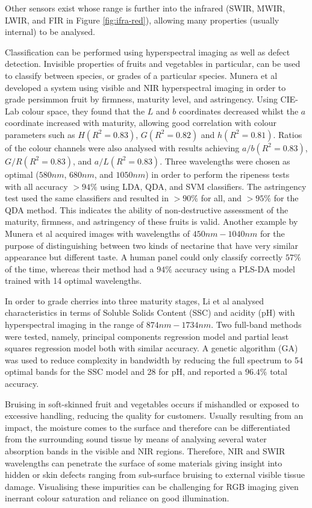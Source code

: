 \documentclass[fleqn,twoside,12pt]{report}
\begin{document}
Other sensors exist whose range is further into the infrared (SWIR, MWIR, LWIR, and FIR in Figure \ref{fig:ifra-red}), allowing many properties (usually internal) to be analysed.

Classification can be performed using hyperspectral imaging as well as defect detection. Invisible properties of fruits and vegetables in particular, can be used to classify between species, or grades of a particular species. Munera et al \cite{munera} developed a system using visible and NIR hyperspectral imaging in order to grade persimmon fruit by firmness, maturity level, and astringency. Using CIE-Lab colour space, they found that the $L$ and $b$ coordinates decreased whilst the $a$ coordinate increased with maturity, allowing good correlation with colour parameters such as $H(R^2 = 0.83)$, $G(R^2 = 0.82)$ and $h(R^2 = 0.81)$. Ratios of the colour channels were also analysed with results achieving $a/b(R^2 = 0.83)$, $G/R(R^2 = 0.83)$, and $a/L(R^2 = 0.83)$. Three wavelengths were chosen as optimal ($580nm$, $680nm$, and $1050nm$) in order to perform the ripeness tests with all accuracy $>94\%$ using LDA, QDA, and SVM classifiers. The astringency test used the same classifiers and resulted in $>90\%$ for all, and $>95\%$ for the QDA method. This indicates the ability of non-destructive assessment of the maturity, firmness, and astringency of these fruits is valid. Another example by Munera et al \cite{munera2} acquired images with wavelengths of $450nm-1040nm$ for the purpose of distinguishing between two kinds of nectarine that have very similar appearance but different taste. A human panel could only classify correctly $57\%$ of the time, whereas their method had a $94\%$ accuracy using a PLS-DA model trained with 14 optimal wavelengths. 

In order to grade cherries into three maturity stages, Li et al \cite{li} analysed characteristics in terms of Soluble Solids Content (SSC) and acidity (pH) with hyperspectral imaging in the range of $874nm-1734nm$. Two full-band methods were tested, namely, principal components regression model and partial least squares regression model both with similar accuracy. A genetic algorithm (GA) was used to reduce complexity in bandwidth by reducing the full spectrum to 54 optimal bands for the SSC model and 28 for pH, and reported a $96.4\%$ total accuracy.  


Bruising in soft-skinned fruit and vegetables occurs if mishandled or exposed to excessive handling, reducing the quality for customers. Usually resulting from an impact, the moisture comes to the surface and therefore can be differentiated from the surrounding sound tissue by means of analysing several water absorption bands in the visible and NIR regions. Therefore, NIR and SWIR wavelengths can penetrate the surface of some materials giving insight into hidden or skin defects ranging from sub-surface bruising to external visible tissue damage. Visualising these impurities can be challenging for RGB imaging given inerrant colour saturation and reliance on good illumination. 
\end{document}
